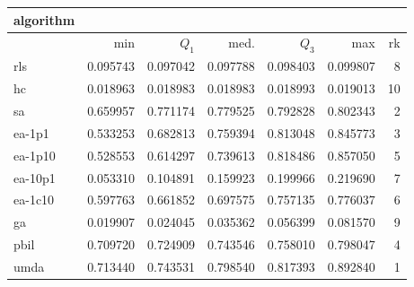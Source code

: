 \begin{tabular}{@{}l*{5}{>{{}}N{1}{3}}>{{}}N{2}{0}@{}}
\toprule
{algorithm} &  \\
\midrule
& {min} & {$Q_1$} & {med.} & {$Q_3$} & {max} & {rk}\\
\midrule
rls & 0.095743 & 0.097042 & 0.097788 & 0.098403 & 0.099807 & 8\\
hc & 0.018963 & 0.018983 & 0.018983 & 0.018993 & 0.019013 & 10\\
sa & 0.659957 & {\color{blue}} 0.771174 & 0.779525 & 0.792828 & 0.802343 & 2\\
ea-1p1 & 0.533253 & 0.682813 & 0.759394 & 0.813048 & 0.845773 & 3\\
ea-1p10 & 0.528553 & 0.614297 & 0.739613 & {\color{blue}} 0.818486 & 0.857050 & 5\\
ea-10p1 & 0.053310 & 0.104891 & 0.159923 & 0.199966 & 0.219690 & 7\\
ea-1c10 & 0.597763 & 0.661852 & 0.697575 & 0.757135 & 0.776037 & 6\\
ga & 0.019907 & 0.024045 & 0.035362 & 0.056399 & 0.081570 & 9\\
pbil & 0.709720 & 0.724909 & 0.743546 & 0.758010 & 0.798047 & 4\\
umda & {\color{blue}} 0.713440 & 0.743531 & {\color{blue}} 0.798540 & 0.817393 & {\color{blue}} 0.892840 & 1\\
\bottomrule
\end{tabular}
